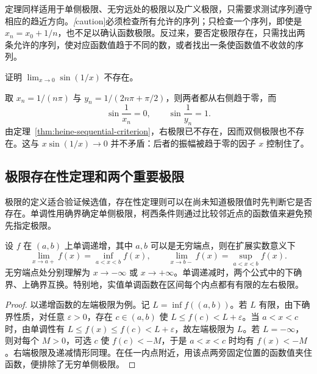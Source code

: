 \documentclass[UTF8,12pt,a4paper,fontset=fandol]{ctexbook}
\begin{document}
定理同样适用于单侧极限、无穷远处的极限以及广义极限，只需要求测试序列遵守相应的趋近方向。\emph[caution]{必须检查所有允许的序列；只检查一个序列，即使是 $x_n=x_0+1/n$，也不足以确认函数极限。}反过来，要否定极限存在，只需找出两条允许的序列，使对应函数值趋于不同的数，或者找出一条使函数值不收敛的序列。

\begin{example}
\label{ex:oscillatory-function-no-limit}
证明 $\lim_{x\to0}\sin(1/x)$ 不存在。
\end{example}

\begin{solve}
取 $x_n=1/(n\pi)$ 与 $y_n=1/(2n\pi+\pi/2)$，则两者都从右侧趋于零，而
\[
    \sin\frac1{x_n}=0,\qquad \sin\frac1{y_n}=1.
\]
由定理~\ref{thm:heine-sequential-criterion}，右极限已不存在，因而双侧极限也不存在。这与 $x\sin(1/x)\to0$ 并不矛盾：后者的振幅被趋于零的因子 $x$ 控制住了。
\end{solve}

\subsection{极限存在性定理和两个重要极限}
\label{subsec:limit-existence-and-two-important-limits}

极限的定义适合验证候选值，存在性定理则可以在尚未知道极限值时先判断它是否存在。单调性用确界确定单侧极限，柯西条件则通过比较邻近点的函数值来避免预先指定极限。

\begin{theorem}[单调函数的单侧极限]
\label{thm:monotone-function-one-sided-limits}
设 $f$ 在 $(a,b)$ 上单调递增，其中 $a,b$ 可以是无穷端点，则在扩展实数意义下
\begin{equation}
    \lim_{x\to a+}f(x)=\inf_{a<x<b}f(x),
    \qquad
    \lim_{x\to b-}f(x)=\sup_{a<x<b}f(x).
    \label{eq:monotone-function-endpoint-limits}
\end{equation}
无穷端点处分别理解为 $x\to-\infty$ 或 $x\to+\infty$。单调递减时，两个公式中的下确界、上确界互换。特别地，实值单调函数在区间每个内点都有有限的左右极限。
\end{theorem}

\begin{proof}
以递增函数的左端极限为例。记 $L=\inf f((a,b))$。若 $L$ 有限，由下确界性质，对任意 $\varepsilon>0$，存在 $c\in(a,b)$ 使 $L\leq f(c)<L+\varepsilon$。当 $a<x<c$ 时，由单调性有 $L\leq f(x)\leq f(c)<L+\varepsilon$，故左端极限为 $L$。若 $L=-\infty$，则对每个 $M>0$，可选 $c$ 使 $f(c)<-M$，于是 $a<x<c$ 时均有 $f(x)<-M$。右端极限及递减情形同理。在任一内点附近，用该点两旁固定位置的函数值夹住函数，便排除了无穷单侧极限。
\end{proof}
\end{document}
